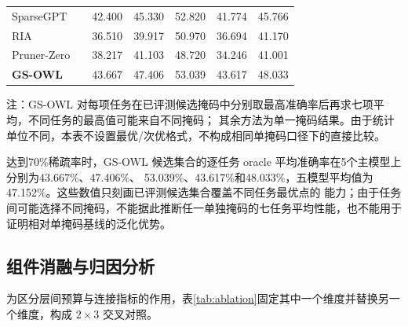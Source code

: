\documentclass[UTF8,fontset=fandol]{ctexart}
\begin{document}
\begin{table}[!htbp]
\begin{tabular*}{0.98\textwidth}{@{\extracolsep{\fill}}lcrrrrr@{}}
SparseGPT & & 42.400 & 45.330 & 52.820 & 41.774 & 45.766 \\
RIA & & 36.510 & 39.917 & 50.970 & 36.694 & 41.170 \\
Pruner-Zero & & 38.217 & 41.103 & 48.720 & 34.246 & 41.001 \\
\textbf{GS-OWL} & & 43.667 & 47.406 & 53.039 & 43.617 & 48.033 \\
\bottomrule
\end{tabular*}
\vspace{2pt}
\parbox{0.98\textwidth}{\scriptsize
注：GS-OWL 对每项任务在已评测候选掩码中分别取最高准确率后再求七项平均，不同任务的最高值可能来自不同掩码；
其余方法为单一掩码结果。由于统计单位不同，本表不设置最优/次优格式，不构成相同单掩码口径下的直接比较。}
\end{table}

达到70\%稀疏率时，GS-OWL 候选集合的逐任务 oracle 平均准确率在5个主模型上分别为43.667\%、47.406\%、
53.039\%、43.617\%和48.033\%，五模型平均值为47.152\%。这些数值只刻画已评测候选集合覆盖不同任务最优点的
能力；由于任务间可能选择不同掩码，不能据此推断任一单独掩码的七任务平均性能，也不能用于证明相对单掩码基线的泛化优势。

\FloatBarrier
\subsection{组件消融与归因分析}

为区分层间预算与连接指标的作用，表\ref{tab:ablation}固定其中一个维度并替换另一个维度，构成
$2\times3$ 交叉对照。
\end{document}
